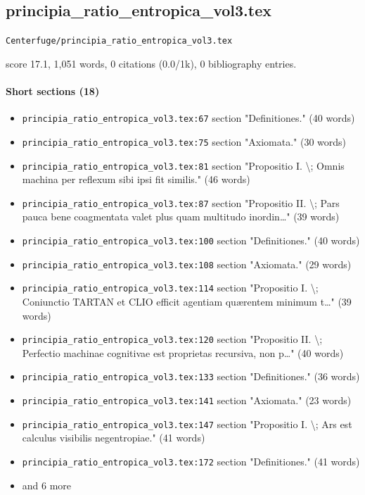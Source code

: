 \documentclass[11pt]{article}
\newcommand{\loc}[1]{{\small\color{muted}\texttt{#1}}}
\begin{document}
\subsection{principia\_ratio\_entropica\_vol3.tex}
\loc{Centerfuge/\allowbreak{}principia\_ratio\_entropica\_vol3.tex}\par
score 17.1, 1,051 words, 0 citations (0.0/1k), 0 bibliography entries.

\paragraph{Short sections (18)}
\begin{itemize}
\item \loc{principia\_ratio\_entropica\_vol3.tex:67} section "Definitiones." (40 words)
\item \loc{principia\_ratio\_entropica\_vol3.tex:75} section "Axiomata." (30 words)
\item \loc{principia\_ratio\_entropica\_vol3.tex:81} section "Propositio I. \textbackslash{}; Omnis machina per reflexum sibi ipsi fit similis." (46 words)
\item \loc{principia\_ratio\_entropica\_vol3.tex:87} section "Propositio II. \textbackslash{}; Pars pauca bene coagmentata valet plus quam multitudo inordin\ldots{}" (39 words)
\item \loc{principia\_ratio\_entropica\_vol3.tex:100} section "Definitiones." (40 words)
\item \loc{principia\_ratio\_entropica\_vol3.tex:108} section "Axiomata." (29 words)
\item \loc{principia\_ratio\_entropica\_vol3.tex:114} section "Propositio I. \textbackslash{}; Coniunctio TARTAN et CLIO efficit agentiam quærentem minimum t\ldots{}" (39 words)
\item \loc{principia\_ratio\_entropica\_vol3.tex:120} section "Propositio II. \textbackslash{}; Perfectio machinae cognitivae est proprietas recursiva, non p\ldots{}" (40 words)
\item \loc{principia\_ratio\_entropica\_vol3.tex:133} section "Definitiones." (36 words)
\item \loc{principia\_ratio\_entropica\_vol3.tex:141} section "Axiomata." (23 words)
\item \loc{principia\_ratio\_entropica\_vol3.tex:147} section "Propositio I. \textbackslash{}; Ars est calculus visibilis negentropiae." (41 words)
\item \loc{principia\_ratio\_entropica\_vol3.tex:172} section "Definitiones." (41 words)
\item[] {\color{muted}\small and 6 more}
\end{itemize}
\end{document}
